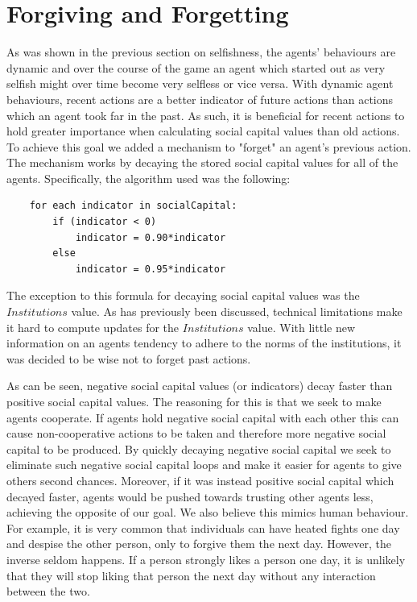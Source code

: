 \section{Forgiving and Forgetting}

As was shown in the previous section on selfishness, the agents' behaviours are dynamic and over the course of the game an agent which started out as very selfish might over time become very selfless or vice versa. With dynamic agent behaviours, recent actions are a better indicator of future actions than actions which an agent took far in the past. As such, it is beneficial for recent actions to hold greater importance when calculating social capital values than old actions. To achieve this goal we added a mechanism to "forget" an agent's previous action. The mechanism works by decaying the stored social capital values for all of the agents. Specifically, the algorithm used was the following:

\begin{verbatim}
    for each indicator in socialCapital:
        if (indicator < 0)
            indicator = 0.90*indicator
        else
            indicator = 0.95*indicator
\end{verbatim}

The exception to this formula for decaying social capital values was the $Institutions$ value. As has previously been discussed, technical limitations make it hard to compute updates for the $Institutions$ value. With little new information on an agents tendency to adhere to the norms of the institutions, it was decided to be wise not to forget past actions.

As can be seen, negative social capital values (or indicators) decay faster than positive social capital values. The reasoning for this is that we seek to make agents cooperate. If agents hold negative social capital with each other this can cause non-cooperative actions to be taken and therefore more negative social capital to be produced. By quickly decaying negative social capital we seek to eliminate such negative social capital loops and make it easier for agents to give others second chances. Moreover, if it was instead positive social capital which decayed faster, agents would be pushed towards trusting other agents less, achieving the opposite of our goal. We also believe this mimics human behaviour. For example, it is very common that individuals can have heated fights one day and despise the other person, only to forgive them the next day. However, the inverse seldom happens. If a person strongly likes a person one day, it is unlikely that they will stop liking that person the next day without any interaction between the two.

